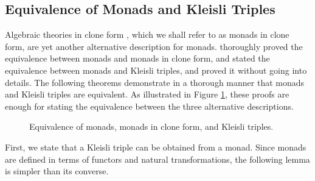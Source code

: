 \subsection{Equivalence of Monads and Kleisli Triples}

Algebraic theories in clone form \parencite[24]{manes-1976}, which we
shall refer to as monads in clone form, are yet another alternative
description for monads. \textcite[26--29]{manes-1976} thoroughly
proved the equivalence between monads and monads in clone form, and
\textcite[61]{moggi-1991} stated the equivalence between monads and
Kleisli triples, and proved it without going into details. The
following theorems demonstrate in a thorough manner that monads and
Kleisli triples are equivalent. As illustrated in Figure
\ref{fig:monad-theory-triple}, these proofs are enough for stating the
equivalence between the three alternative descriptions.

\begin{figure}[htb]
  \begin{center}
  \end{center}
  \caption{Equivalence of monads, monads in clone form, and Kleisli triples.}
  \label{fig:monad-theory-triple}
\end{figure}

First, we state that a Kleisli triple can be obtained from a monad.
Since monads are defined in terms of functors and natural
transformations, the following lemma is simpler than its converse.

